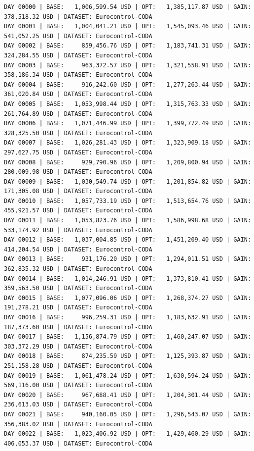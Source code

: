 \documentclass[11pt,a4paper]{article}
\begin{document}
\begin{verbatim}
DAY 00000 | BASE:   1,006,599.54 USD | OPT:   1,385,117.87 USD | GAIN: 378,518.32 USD | DATASET: Eurocontrol-CODA
DAY 00001 | BASE:   1,004,041.21 USD | OPT:   1,545,093.46 USD | GAIN: 541,052.25 USD | DATASET: Eurocontrol-CODA
DAY 00002 | BASE:     859,456.76 USD | OPT:   1,183,741.31 USD | GAIN: 324,284.55 USD | DATASET: Eurocontrol-CODA
DAY 00003 | BASE:     963,372.57 USD | OPT:   1,321,558.91 USD | GAIN: 358,186.34 USD | DATASET: Eurocontrol-CODA
DAY 00004 | BASE:     916,242.60 USD | OPT:   1,277,263.44 USD | GAIN: 361,020.84 USD | DATASET: Eurocontrol-CODA
DAY 00005 | BASE:   1,053,998.44 USD | OPT:   1,315,763.33 USD | GAIN: 261,764.89 USD | DATASET: Eurocontrol-CODA
DAY 00006 | BASE:   1,071,446.99 USD | OPT:   1,399,772.49 USD | GAIN: 328,325.50 USD | DATASET: Eurocontrol-CODA
DAY 00007 | BASE:   1,026,281.43 USD | OPT:   1,323,909.18 USD | GAIN: 297,627.75 USD | DATASET: Eurocontrol-CODA
DAY 00008 | BASE:     929,790.96 USD | OPT:   1,209,800.94 USD | GAIN: 280,009.98 USD | DATASET: Eurocontrol-CODA
DAY 00009 | BASE:   1,030,549.74 USD | OPT:   1,201,854.82 USD | GAIN: 171,305.08 USD | DATASET: Eurocontrol-CODA
DAY 00010 | BASE:   1,057,733.19 USD | OPT:   1,513,654.76 USD | GAIN: 455,921.57 USD | DATASET: Eurocontrol-CODA
DAY 00011 | BASE:   1,053,823.76 USD | OPT:   1,586,998.68 USD | GAIN: 533,174.92 USD | DATASET: Eurocontrol-CODA
DAY 00012 | BASE:   1,037,004.85 USD | OPT:   1,451,209.40 USD | GAIN: 414,204.54 USD | DATASET: Eurocontrol-CODA
DAY 00013 | BASE:     931,176.20 USD | OPT:   1,294,011.51 USD | GAIN: 362,835.32 USD | DATASET: Eurocontrol-CODA
DAY 00014 | BASE:   1,014,246.91 USD | OPT:   1,373,810.41 USD | GAIN: 359,563.50 USD | DATASET: Eurocontrol-CODA
DAY 00015 | BASE:   1,077,096.06 USD | OPT:   1,268,374.27 USD | GAIN: 191,278.21 USD | DATASET: Eurocontrol-CODA
DAY 00016 | BASE:     996,259.31 USD | OPT:   1,183,632.91 USD | GAIN: 187,373.60 USD | DATASET: Eurocontrol-CODA
DAY 00017 | BASE:   1,156,874.79 USD | OPT:   1,460,247.07 USD | GAIN: 303,372.29 USD | DATASET: Eurocontrol-CODA
DAY 00018 | BASE:     874,235.59 USD | OPT:   1,125,393.87 USD | GAIN: 251,158.28 USD | DATASET: Eurocontrol-CODA
DAY 00019 | BASE:   1,061,478.24 USD | OPT:   1,630,594.24 USD | GAIN: 569,116.00 USD | DATASET: Eurocontrol-CODA
DAY 00020 | BASE:     967,688.41 USD | OPT:   1,204,301.44 USD | GAIN: 236,613.03 USD | DATASET: Eurocontrol-CODA
DAY 00021 | BASE:     940,160.05 USD | OPT:   1,296,543.07 USD | GAIN: 356,383.02 USD | DATASET: Eurocontrol-CODA
DAY 00022 | BASE:   1,023,406.92 USD | OPT:   1,429,460.29 USD | GAIN: 406,053.37 USD | DATASET: Eurocontrol-CODA

\end{verbatim}
\end{document}
